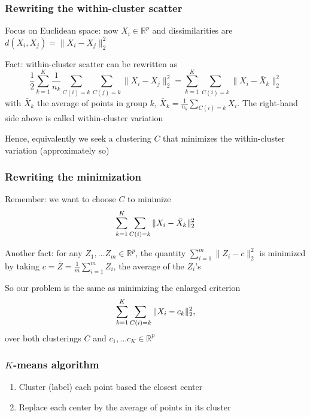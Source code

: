 \documentclass[mathserif]{beamer}
\def\half{\frac{1}{2}}
\def\R{\mathds{R}}
\def\blue{\color[rgb]{0,0,0.8}}
\begin{document}
\begin{frame}
\frametitle{Rewriting the within-cluster scatter}
Focus on Euclidean space: now $X_i \in \R^p$ and
dissimilarities are $d(X_i,X_j)=\|X_i-X_j\|_2^2$

\bigskip
Fact: within-cluster scatter can
be rewritten as
$$\half\sum_{k=1}^K \frac{1}{n_k} \sum_{C(i)=k} 
\sum_{C(j)=k} \|X_i-X_j\|_2^2 = 
\sum_{k=1}^K \sum_{C(i)=k} \|X_i-\bar{X}_k\|_2^2$$
with $\bar{X}_k$ the average of points
in group $k$,  
$\bar{X}_k = \frac{1}{n_k} \sum_{C(i)=k} X_i$.
The right-hand side above is called
{\blue within-cluster variation}

\bigskip
Hence, equivalently we seek 
a clustering $C$ that minimizes
the within-cluster variation (approximately so)
\end{frame}

\begin{frame}
\frametitle{Rewriting the minimization}
Remember: we want to choose $C$ to minimize
\vspace{-5pt}
$$\sum_{k=1}^K \sum_{C(i)=k} \|X_i-\bar{X}_k\|_2^2
\vspace{-5pt}$$

\bigskip
Another fact: for any $Z_1,\ldots Z_m \in \R^p$, the 
quantity $\sum_{i=1}^m \|Z_i-c\|_2^2$ is minimized by 
taking 
$c=\bar{Z}=\frac{1}{m} \sum_{i=1}^m Z_i$, the average
of the $Z_i$'s

\bigskip
So our problem is the same as minimizing the 
{\blue enlarged criterion}
\vspace{-5pt}
$$\sum_{k=1}^K \sum_{C(i)=k} \|X_i-c_k\|_2^2,
\vspace{-5pt}$$
over both clusterings $C$ and $c_1,\ldots c_K\in\R^p$
\end{frame}

\begin{frame}
\frametitle{$K$-means algorithm}

\begin{enumerate}
\item Cluster (label) each point based the closest 
center
\item Replace each center by the average of points in 
its cluster
\end{enumerate}
\vspace*{1em}
\end{frame}
\end{document}

